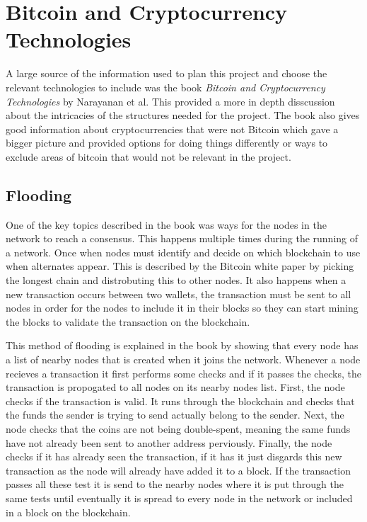 \documentclass{l4proj}
\begin{document}
\section{Bitcoin and Cryptocurrency Technologies}
A large source of the information used to plan this project and choose the relevant technologies to include was the
book \emph{Bitcoin and Cryptocurrency Technologies} by Narayanan et al. This provided a more in depth disscussion
about the intricacies of the structures needed for the project. The book also gives good information about cryptocurrencies
that were not Bitcoin which gave a bigger picture and provided options for doing things differently or ways to 
exclude areas of bitcoin that would not be relevant in the project.

\subsection{Flooding}
One of the key topics described in the book was ways for the nodes in the network to reach a consensus. This happens
multiple times during the running of a network. Once when nodes must identify and decide on which blockchain to use when
alternates appear. This is described by the Bitcoin white paper by picking the longest chain and distrobuting this to 
other nodes. It also happens when a new transaction occurs between two wallets, the transaction must be sent to all
nodes in order for the nodes to include it in their blocks so they can start mining the blocks to validate the transaction 
on the blockchain.

This method of flooding is explained in the book by showing that every node has a list of nearby nodes that is created
when it joins the network. Whenever a node recieves a transaction it first performs some checks and if it passes the 
checks, the transaction is propogated to all nodes on its nearby nodes list. First, the node checks if the transaction is
valid. It runs through the blockchain and checks that the funds the sender is trying to send actually belong to the sender.
Next, the node checks that the coins are not being double-spent, meaning the same funds have not already been sent to another
address perviously. Finally, the node checks if it has already seen the transaction, if it has it just disgards this new
transaction as the node will already have added it to a block. If the transaction passes all these test it is send to the
nearby nodes where it is put through the same tests until eventually it is spread to every node in the network or included
in a block on the blockchain.
\end{document}
